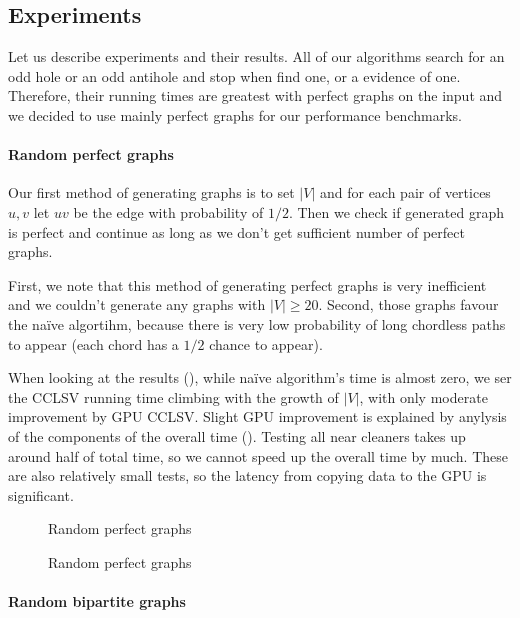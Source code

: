 \subsection{Experiments}
\label{sec:experiments}

Let us describe experiments and their results. All of our algorithms search for an odd hole or an odd antihole and stop when find one, or a evidence of one. Therefore, their running times are greatest with perfect graphs on the input and we decided to use mainly perfect graphs for our performance benchmarks.

\paragraph{Random perfect graphs}
Our first method of generating graphs is to set $|V|$ and for each pair of vertices $u, v$ let $uv$ be the edge with probability of $1/2$. Then we check if generated graph is perfect and continue as long as we don't get sufficient number of perfect graphs. 

First, we note that this method of generating perfect graphs is very inefficient and we couldn't generate any graphs with $|V| \geq 20$. Second, those graphs favour the na\"ive algortihm, because there is very low probability of long chordless paths to appear (each chord has a $1/2$ chance to appear).

When looking at the results (), while na\"ive algorithm's time is almost zero, we ser the CCLSV running time climbing with the growth of $|V|$, with only moderate improvement by GPU CCLSV. Slight GPU improvement is explained by anylysis of the components of the overall time (). Testing all near cleaners takes up around half of total time, so we cannot speed up the overall time by much. These are also relatively small tests, so the latency from copying data to the GPU is significant.


\begin{figure}
  \centering
  
  \caption{Random perfect graphs}
  \label{plot:perfLines}
\end{figure}

\begin{figure}
  \centering
  
  \caption{Random perfect graphs}
  \label{plot:perfDet}
\end{figure}

\paragraph{Random bipartite graphs}

